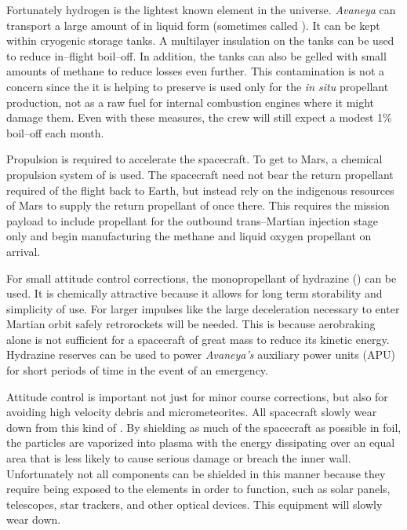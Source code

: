 Fortunately hydrogen is the lightest known element in the universe. {\it Avaneya} can transport a large amount of  in liquid form (sometimes called ). It can be kept within cryogenic storage tanks. A multilayer insulation on the tanks can be used to reduce in--flight boil--off. In addition, the tanks can also be gelled with small amounts of methane to reduce losses even further. This  contamination is not a concern since the  it is helping to preserve is used only for the {\it in situ} propellant production, not as a raw fuel for internal combustion engines where it might damage them. Even with these measures, the crew will still expect a modest 1\% boil--off each month.

Propulsion is required to accelerate the spacecraft. To get to Mars, a chemical propulsion system of  is used. The spacecraft need not bear the return propellant required of the flight back to Earth, but instead rely on the indigenous resources of Mars to supply the return propellant of  once there. This requires the mission payload to include propellant for the outbound trans--Martian injection stage only and begin manufacturing the methane and liquid oxygen propellant on arrival. 

For small attitude control corrections, the monopropellant of hydrazine () can be used. It is chemically attractive because it allows for long term storability and simplicity of use. For larger impulses like the large deceleration necessary to enter Martian orbit safely retrorockets will be needed. This is because aerobraking alone is not sufficient for a spacecraft of great mass to reduce its kinetic energy. Hydrazine reserves can be used to power {\it Avaneya's} auxiliary power units (APU) for short periods of time in the event of an emergency.

Attitude control is important not just for minor course corrections, but also for avoiding high velocity debris and micrometeorites. All spacecraft slowly wear down from this kind of . By shielding as much of the spacecraft as possible in foil, the particles are vaporized into plasma with the energy dissipating over an equal area that is less likely to cause serious damage or breach the inner wall. Unfortunately not all components can be shielded in this manner because they require being exposed to the elements in order to function, such as solar panels, telescopes, star trackers, and other optical devices. This equipment will slowly wear down.

